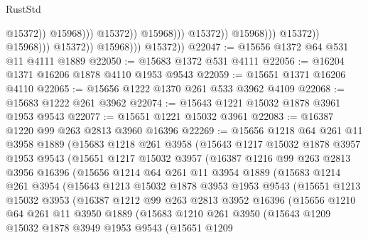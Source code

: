 \begin{lexlean}{RustStd}
\begin{coremodule}
                                                          @15372))
                                                      @15968)))
                                                @15372))
                                            @15968)))
                                      @15372))
                                  @15968)))
                            @15372))
                        @15968)))
                  @15372))
              @15968)))
        @15372))
@22047 := @15656 @1372 @64 @531 @11 @4111 @1889
@22050 := @15683 @1372 @531 @4111
@22056 := @16204 @1371 @16206 @1878 @4110 @1953 @9543
@22059 := @15651 @1371 @16206 @4110
@22065 := @15656 @1222 @1370 @261 @533 @3962 @4109
@22068 := @15683 @1222 @261 @3962
@22074 := @15643 @1221 @15032 @1878 @3961 @1953 @9543
@22077 := @15651 @1221 @15032 @3961
@22083 := @16387 @1220 @99 @263 @2813 @3960 @16396
@22269 := @15656
    @1218
    @64
    @261
    @11
    @3958
    @1889
    (@15683
      @1218
      @261
      @3958
      (@15643
        @1217
        @15032
        @1878
        @3957
        @1953
        @9543
        (@15651
          @1217
          @15032
          @3957
          (@16387
            @1216
            @99
            @263
            @2813
            @3956
            @16396
            (@15656
              @1214
              @64
              @261
              @11
              @3954
              @1889
              (@15683
                @1214
                @261
                @3954
                (@15643
                  @1213
                  @15032
                  @1878
                  @3953
                  @1953
                  @9543
                  (@15651
                    @1213
                    @15032
                    @3953
                    (@16387
                      @1212
                      @99
                      @263
                      @2813
                      @3952
                      @16396
                      (@15656
                        @1210
                        @64
                        @261
                        @11
                        @3950
                        @1889
                        (@15683
                          @1210
                          @261
                          @3950
                          (@15643
                            @1209
                            @15032
                            @1878
                            @3949
                            @1953
                            @9543
                            (@15651
                              @1209

\end{coremodule}
\end{lexlean}
